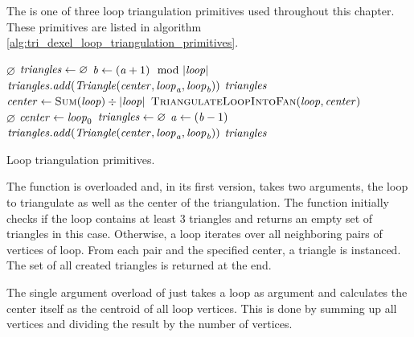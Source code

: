The  is one of three loop triangulation primitives used throughout this chapter.
These primitives are listed in algorithm \ref{alg:tri_dexel_loop_triangulation_primitives}.
%
\begin{algorithm}
	\centering
	\begin{algorithmic}[1]
				\State \Return $\varnothing$
			\EndIf
			\State $\mathit{triangles} \gets \varnothing$
				\State $\mathit{b} \gets (\mathit{a} + 1) \mod |\mathit{loop}|$
				\State $\mathit{triangles}.\mathit{add}(\mathit{Triangle}(\mathit{center}, \mathit{loop}_{\mathit{a}}, \mathit{loop}_{\mathit{b}}))$
			\EndFor
			\State \Return $\mathit{triangles}$
		\EndFunction
		\\
			\State $\var{center} \gets \Call{Sum}{\var{loop}} \div |\var{loop}|$
			\State \Return $\Call{TriangulateLoopIntoFan}{\var{loop}, \var{center}}$
		\EndFunction
		\\
				\State \Return $\varnothing$
			\EndIf
			\State $\mathit{center} \gets \mathit{loop}_0$
			\State $\mathit{triangles} \gets \varnothing$
				\State $\mathit{a} \gets (\mathit{b} - 1)$
				\State $\mathit{triangles}.\mathit{add}(\mathit{Triangle}(\mathit{center}, \mathit{loop}_{\mathit{a}}, \mathit{loop}_{\mathit{b}}))$
			\EndFor
			\State \Return $\mathit{triangles}$
		\EndFunction
	\end{algorithmic}
	\caption{
		Loop triangulation primitives.
	}
	\label{alg:tri_dexel_loop_triangulation_primitives}
\end{algorithm}
%
The  function is overloaded and, in its first version, takes two arguments, the loop to triangulate as well as the center of the triangulation.
The function initially checks if the loop contains at least 3 triangles and returns an empty set of triangles in this case.
Otherwise, a loop iterates over all neighboring pairs of vertices of loop.
From each pair and the specified center, a triangle is instanced.
The set of all created triangles is returned at the end.

The single argument overload of  just takes a loop as argument and calculates the center itself as the centroid of all loop vertices.
This is done by summing up all vertices and dividing the result by the number of vertices.

